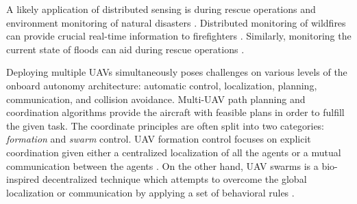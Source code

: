 \documentclass[a4paper,11pt,titlepage,twoside]{book}
\begin{document}
A likely application of distributed sensing is during rescue operations and environment monitoring of natural disasters \cite{manfreda2018use}.
Distributed monitoring of wildfires can provide crucial real-time information to firefighters \cite{yuan2015survey, pham2020distributed}.
Similarly, monitoring the current state of floods can aid during rescue operations \cite{karamuz2020use, perks2016advances}.

Deploying multiple \acp{UAV} simultaneously poses challenges on various levels of the onboard autonomy architecture: automatic control, localization, planning, communication, and collision avoidance.
Multi-\ac{UAV} path planning and coordination algorithms provide the aircraft with feasible plans in order to fulfill the given task.
The coordinate principles are often split into two categories: \emph{formation} and \emph{swarm} control.
\ac{UAV} formation control focuses on explicit coordination given either a centralized localization of all the agents or a mutual communication between the agents \cite{kamel2017model, kuriki2014avoidance, rezaee2013motion, wang2015efficient}.
On the other hand, \ac{UAV} swarms is a bio-inspired decentralized technique which attempts to overcome the global localization or communication by applying a set of behavioral rules \cite{mcguire2019minimal, burkle2011towards, saulnier2017flocking}.
\end{document}
